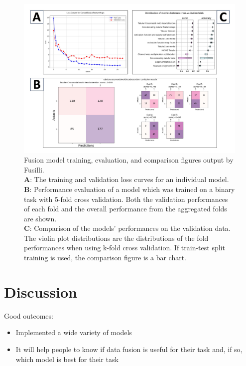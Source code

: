 \begin{figure}
    \centering
    \includegraphics[width=1\linewidth]{figures/fusilli_outputs}
    \caption{Fusion model training, evaluation, and comparison figures output by Fusilli. \\
    \textbf{A}: The training and validation loss curves for an individual model.\\
    \textbf{B}: Performance evaluation of a model which was trained on a binary task with 5-fold cross validation. Both the validation performances of each fold and the overall performance from the aggregated folds are shown. \\
    \textbf{C}: Comparison of the models' performances on the validation data. The violin plot distributions are the distributions of the fold performances when using k-fold cross validation. If train-test split training is used, the comparison figure is a bar chart.
    }
    \label{fig:fusillioutputs}
\end{figure}


\section{Discussion}

Good outcomes:
\begin{itemize}
    \item Implemented a wide variety of models
    \item It will help people to know if data fusion is useful for their task and, if so, which model is best for their task
\end{itemize}

